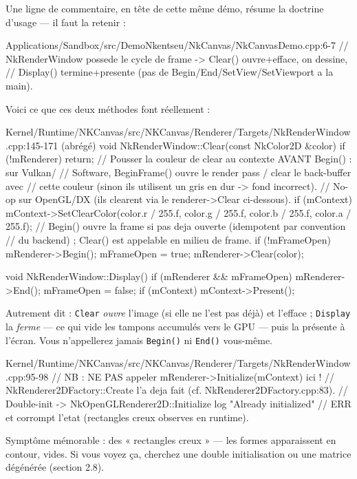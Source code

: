 Une ligne de commentaire, en tête de cette même démo, résume la doctrine
d'usage — il faut la retenir :

\begin{nkcode}{Applications/Sandbox/src/DemoNkentseu/NkCanvas/NkCanvasDemo.cpp:6-7}
// NkRenderWindow possede le cycle de frame -> Clear() ouvre+efface, on dessine,
// Display() termine+presente (pas de Begin/End/SetView/SetViewport a la main).
\end{nkcode}

Voici ce que ces deux méthodes font réellement :

\begin{nkcode}{Kernel/Runtime/NKCanvas/src/NKCanvas/Renderer/Targets/NkRenderWindow.cpp:145-171 (abrégé)}
void NkRenderWindow::Clear(const NkColor2D &color) {
    if (!mRenderer) return;
    // Pousser la couleur de clear au contexte AVANT Begin() : sur Vulkan/
    // Software, BeginFrame() ouvre le render pass / clear le back-buffer avec
    // cette couleur (sinon ils utilisent un gris en dur -> fond incorrect).
    // No-op sur OpenGL/DX (ils clearent via le renderer->Clear ci-dessous).
    if (mContext)
        mContext->SetClearColor(color.r / 255.f, color.g / 255.f,
                                color.b / 255.f, color.a / 255.f);
    // Begin() ouvre la frame si pas deja ouverte (idempotent par convention
    // du backend) ; Clear() est appelable en milieu de frame.
    if (!mFrameOpen) { mRenderer->Begin(); mFrameOpen = true; }
    mRenderer->Clear(color);
}

void NkRenderWindow::Display() {
    if (mRenderer && mFrameOpen) { mRenderer->End(); mFrameOpen = false; }
    if (mContext) mContext->Present();
}
\end{nkcode}

Autrement dit : \texttt{Clear} \emph{ouvre} l'image (si elle ne l'est pas déjà)
et l'efface ; \texttt{Display} la \emph{ferme} — ce qui vide les tampons
accumulés vers le GPU — puis la présente à l'écran. Vous n'appellerez jamais
\texttt{Begin()} ni \texttt{End()} vous-même.

\begin{nkpiege}
\begin{nkcode}{Kernel/Runtime/NKCanvas/src/NKCanvas/Renderer/Targets/NkRenderWindow.cpp:95-98}
// NB : NE PAS appeler mRenderer->Initialize(mContext) ici !
// NkRenderer2DFactory::Create l'a deja fait (cf. NkRenderer2DFactory.cpp:83).
// Double-init -> NkOpenGLRenderer2D::Initialize log "Already initialized"
// ERR et corrompt l'etat (rectangles creux observes en runtime).
\end{nkcode}
Symptôme mémorable : des « rectangles creux » — les formes apparaissent en
contour, vides. Si vous voyez ça, cherchez une double initialisation ou une
matrice dégénérée (section 2.8).
\end{nkpiege}

